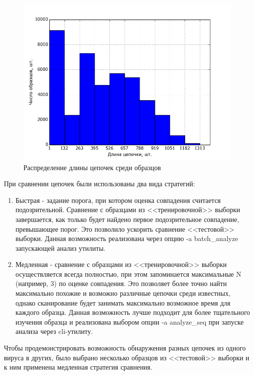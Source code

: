 \begin {figure}[ht]
        \centering
        \includegraphics[width=\linewidth] {img/sequence_len_hist.png}
        \caption {Распределение длины цепочек среди образцов}
        \label {fig:seq_len_hist}
\end {figure}

При сравнении цепочек были использованы два вида стратегий:
\begin {enumerate}
	\item Быстрая - задание порога, при котором оценка совпадения считается подозрительной. Сравнение с образцами из <<тренировочной>> выборки завершается, как только будет найдено первое подозрительное совпадение, превышающее порог. Это позволило ускорить сравнение <<тестовой>> выборки. Данная возможность реализована через опцию -a batch\_analyze запускающей анализ утилиты.
	\item Медленная - сравнение с образцами из <<тренировочной>> выборки осуществляется всегда полностью, при этом запоминается максимальные N (например, 3) по оценке совпадения. Это позволяет более точно найти максимально похожие и возможно различные цепочки среди известных, однако сканирование будет занимать максимально возможное время для каждого образца. Данная возможность лучше подходит для более тщательного изучения образца и реализована выбором опции -a analyze\_seq при запуске анализа через cli-утилиту.
\end {enumerate}

Чтобы продемонстрировать возможность обнаружения разных цепочек из одного вируса в других, было выбрано несколько образцов из <<тестовой>> выборки и к ним применена медленная стратегия сравнения.

